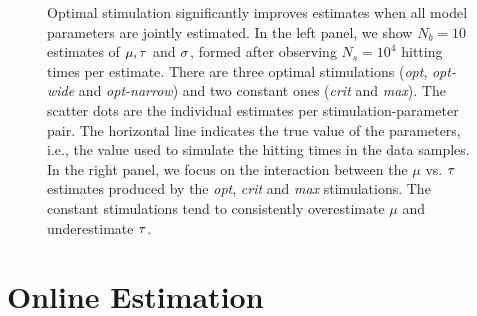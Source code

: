 \documentclass[12pt]{article}
\begin{document}
\begin{figure}[htp]
\begin{center}
\caption[Batch estimates for all 3 parameters]{  Optimal stimulation
significantly improves estimates when all model parameters are jointly
estimated.
In the left panel, we show $N_b=10$ estimates of ${\mu },{ \tau }$ and ${\sigma }$, formed after observing $N_s=10^4$ hitting times per estimate. 
 There are three optimal
  stimulations ({\em opt}, {\em opt-wide} and {\em opt-narrow}) and
  two constant ones ({\em crit} and {\em max}). The scatter dots are
  the individual estimates per 
  stimulation-parameter pair. The horizontal line indicates the true value of
  the parameters, i.e., the value used to simulate the hitting times
  in the data samples.
  In the right panel, we focus on the interaction between the $\mu$ vs.
  ${ \tau }$ estimates produced by the {\em opt}, {\em crit} and {\em max}
  stimulations. The constant stimulations tend to consistently overestimate
  $\mu$ and underestimate ${ \tau }$.}
  \label{fig:all_theta_estimates_batch}
\end{center} 
\end{figure}


\section{Online Estimation}
\label{sec:online_estimation} 
\end{document}
